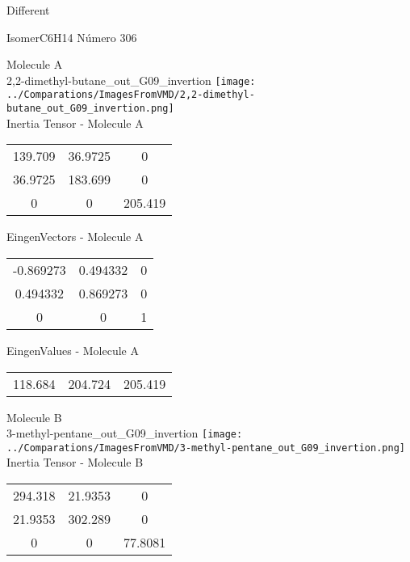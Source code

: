 \begin{center}
\vtab
\vtab
\textcolor{NavyBlue}{\Large Different}
\end{center}

 \newpage

\vtab[-2cm]
\begin{center}
{\large IsomerC6H14 \tab Número 306}
\end{center}
\begin{multicols}{2}
\begin{center}

Molecule A \\ 
2,2-dimethyl-butane\_out\_G09\_invertion
\texttt{[image: ../Comparations/ImagesFromVMD/2,2-dimethyl-butane\_out\_G09\_invertion.png]}
\\
Inertia Tensor - Molecule A \\
\vtab

\begin{tabular}{|c c c|}
139.709	 & 	36.9725	 & 	0	 \\
36.9725	 & 	183.699	 & 	0	 \\
0	 & 	0	 & 	205.419
\end{tabular}

\vtab
 EingenVectors - Molecule A     \\
\vtab
\begin{tabular}{|c c c|}
-0.869273	 & 	0.494332	 & 	0	 \\
0.494332	 & 	0.869273	 & 	0	 \\
0	 & 	0	 & 	1
\end{tabular}

\vtab
 EingenValues - Molecule A     \\
\vtab
\begin{tabular}{|c c c|}
118.684	 & 	204.724	 & 	205.419	 \\
\end{tabular}
\columnbreak

Molecule B \\ 
3-methyl-pentane\_out\_G09\_invertion
\texttt{[image: ../Comparations/ImagesFromVMD/3-methyl-pentane\_out\_G09\_invertion.png]}
\\
Inertia Tensor - Molecule B \\
\vtab

\begin{tabular}{|c c c|}
294.318	 & 	21.9353	 & 	0	 \\
21.9353	 & 	302.289	 & 	0	 \\
0	 & 	0	 & 	77.8081
\end{tabular}


\end{center}
\end{multicols}
